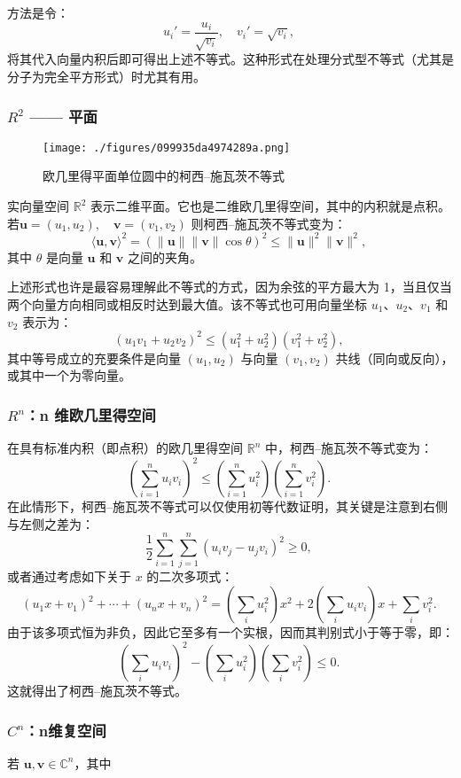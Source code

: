 方法是令：
$$
u_i' = \frac{u_i}{\sqrt{v_i}}, \quad v_i' = \sqrt{v_i},~
$$
将其代入向量内积后即可得出上述不等式。这种形式在处理分式型不等式（尤其是分子为完全平方形式）时尤其有用。
\subsubsection{$R^2$ —— 平面}
\begin{figure}[ht]
\centering
\texttt{[image: ./figures/099935da4974289a.png]}
\caption{欧几里得平面单位圆中的柯西–施瓦茨不等式} \label{fig_KXSW_1}
\end{figure}
实向量空间 $\mathbb{R}^2$ 表示二维平面。它也是二维欧几里得空间，其中的内积就是点积。若$\mathbf{u} = (u_1, u_2),\quad \mathbf{v} = (v_1, v_2)$
则柯西–施瓦茨不等式变为：
$$
\langle \mathbf{u}, \mathbf{v} \rangle^2 = (\|\mathbf{u}\| \|\mathbf{v}\| \cos \theta)^2 \leq \|\mathbf{u}\|^2 \|\mathbf{v}\|^2,~
$$
其中 $\theta$ 是向量 $\mathbf{u}$ 和 $\mathbf{v}$ 之间的夹角。

上述形式也许是最容易理解此不等式的方式，因为余弦的平方最大为 1，当且仅当两个向量方向相同或相反时达到最大值。该不等式也可用向量坐标 $u_1$、$u_2$、$v_1$ 和 $v_2$ 表示为：
$$
(u_1 v_1 + u_2 v_2)^2 \leq (u_1^2 + u_2^2)(v_1^2 + v_2^2),~
$$
其中等号成立的充要条件是向量 $(u_1, u_2)$ 与向量 $(v_1, v_2)$ 共线（同向或反向），或其中一个为零向量。
\subsubsection{$R^n$：n 维欧几里得空间}
在具有标准内积（即点积）的欧几里得空间 $\mathbb{R}^n$ 中，柯西–施瓦茨不等式变为：
$$
\left( \sum_{i=1}^{n} u_i v_i \right)^2 \leq \left( \sum_{i=1}^{n} u_i^2 \right) \left( \sum_{i=1}^{n} v_i^2 \right).~
$$
在此情形下，柯西–施瓦茨不等式可以仅使用初等代数证明，其关键是注意到右侧与左侧之差为：
$$
\frac{1}{2} \sum_{i=1}^{n} \sum_{j=1}^{n} (u_i v_j - u_j v_i)^2 \geq 0,~
$$
或者通过考虑如下关于 $x$ 的二次多项式：
$$
(u_1 x + v_1)^2 + \cdots + (u_n x + v_n)^2 = \left( \sum_i u_i^2 \right) x^2 + 2 \left( \sum_i u_i v_i \right) x + \sum_i v_i^2.~
$$
由于该多项式恒为非负，因此它至多有一个实根，因而其判别式小于等于零，即：
$$
\left( \sum_i u_i v_i \right)^2 - \left( \sum_i u_i^2 \right) \left( \sum_i v_i^2 \right) \leq 0.~
$$
这就得出了柯西–施瓦茨不等式。


\subsubsection{$C^n$：n维复空间}

若 $\mathbf{u}, \mathbf{v} \in \mathbb{C}^n$，其中

